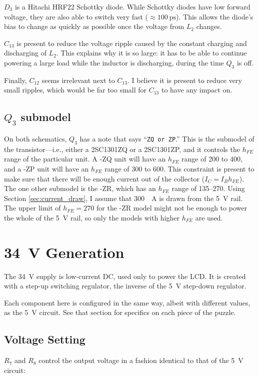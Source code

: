 \documentclass{article}
\newcommand{\model}{\textsf}
\begin{document}
$D_3$ is a Hitachi \model{HRF22} Schottky diode. While Schottky diodes
have low forward voltage, they are also able to switch very fast
($\approx{}\qty{100}{\pico\second}$). This allows the diode's bias to
change as quickly as possible once the voltage from $L_2$ changes.

$C_{13}$ is present to reduce the voltage ripple caused by the
constant charging and discharging of $L_2$. This explains why it is so
large: it has to be able to continue powering a large load while the
inductor is discharging, during the time $Q_3$ is off.

Finally, $C_{12}$ seems irrelevant next to $C_{13}$. I believe it is
present to reduce very small ripples, which would be far too small for
$C_{13}$ to have any impact on.

\subsection{$Q_3$ submodel}
\label{sec:q3_submodel}
On both schematics, $Q_3$ has a note that says ``\texttt{ZQ or ZP}.''
This is the submodel of the transistor---i.e., either a
\model{2SC1301ZQ} or a \model{2SC1301ZP}, and it controls the $h_{FE}$
range of the particular unit. A \model{-ZQ} unit will have an $h_{FE}$
range of 200 to 400, and a \model{-ZP} unit will have an $h_{FE}$
range of 300 to 600. This constraint is present to make sure that
there will be enough current out of the collector ($I_C =
I_Bh_{FE}$). The one other submodel is the \model{-ZR}, which has an
$h_{FE}$ range of 135--270. Using Section \ref{sec:current_draw}, I
assume that \qty{300}{\milli{}A} is drawn from the \qty{5}{\volt}
rail. The upper limit of $h_{FE} = 270$ for the \model{-ZR} model
might not be enough to power the whole of the \qty{5}{\volt} rail, so
only the models with higher $h_{FE}$ are used.

\section{\qty{34}{\volt} Generation}
The \qty{34}{\volt} supply is low-current DC, used only to power the
LCD. It is created with a step-up switching regulator, the inverse of
the \qty{5}{\volt} step-down regulator.

Each component here is configured in the same way, albeit with
different values, as the \qty{5}{\volt} circuit. See that section for
specifics on each piece of the puzzle.

\subsection{Voltage Setting}
$R_7$ and $R_8$ control the output voltage in a fashion identical to
that of the \qty{5}{\volt} circuit:
\end{document}
